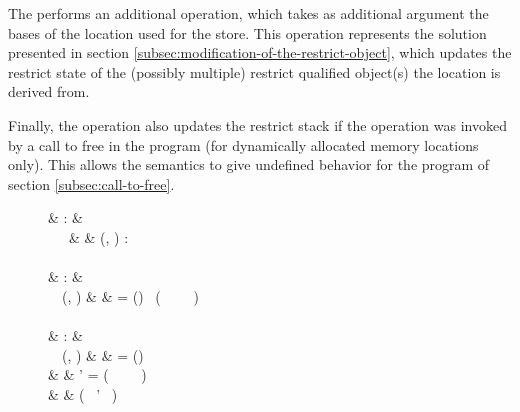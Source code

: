 The  performs an additional  operation, which takes as additional argument the bases
of the location used for the store.
This operation represents the solution presented in section \ref{subsec:modification-of-the-restrict-object}, which
updates the restrict state of the (possibly multiple) restrict qualified object(s) the location is derived from.

Finally, the  operation also updates the restrict stack if the operation was invoked by a call to free in the program
(for dynamically allocated memory locations only).
This allows the semantics to give undefined behavior for the program of section \ref{subsec:call-to-free}. 

\begin{figure}[H]
\begin{functioncode}{
                                                 &   :           &   \Restrictstack \rightarrow \Scopeid \rightarrow \Restrictstack      \\
         \ \Restrictstackvar \ \Scopeidvar \     &   \triangleq  &   (\Scopeidvar, \emptyset) : \Restrictstackvar \\~\\

                                                &   :           &   \Restrictstack \rightarrow \Loc \rightarrow \Optiontype{\Restrictstack} \\
         \ \Restrictstackvar \ (\Simplelocvar, \Basesvar)
                                                                &   \triangleq  &   \pseudolet \Restrictstatevar = (\onlyread{\set{\Basesvar}}) \ \pseudoin ( \ \Restrictstackvar \ \Restrictstatevar \ \Simplelocvar \ \false) \\~\\

                                               &   :           &   \Restrictstack \rightarrow \Loc \rightarrow \Optiontype{\Restrictstack} \\
         \ \Restrictstackvar \ (\Simplelocvar, \Basesvar)
                                                                &   \triangleq  &   \pseudolet \Restrictstatevar = (\restricted{\Basesvar}) \ \pseudoin \\
                                                                &               &   \quad \pseudolet \Restrictstackvar' = ( \ \Restrictstackvar \ \Restrictstatevar \ \Simplelocvar \ \false)\errbind \ \pseudoin \\
                                                                &               &   \quad \quad ( \ \Restrictstackvar' \ \Basesvar) \\~\\ 

}
\end{functioncode}
\end{figure}
